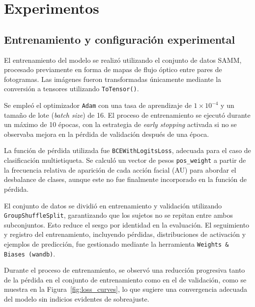 \documentclass[conference]{IEEEtran}
\begin{document}
\section{Experimentos}


\subsection{Entrenamiento y configuración experimental}

El entrenamiento del modelo se realizó utilizando el conjunto de datos SAMM, procesado previamente en forma de mapas de flujo óptico entre pares de fotogramas. Las imágenes fueron transformadas únicamente mediante la conversión a tensores utilizando \texttt{ToTensor()}.

Se empleó el optimizador \texttt{Adam} con una tasa de aprendizaje de $1 \times 10^{-4}$ y un tamaño de lote (\textit{batch size}) de 16. El proceso de entrenamiento se ejecutó durante un máximo de 10 épocas, con la estrategia de \textit{early stopping} activada si no se observaba mejora en la pérdida de validación después de una época.

La función de pérdida utilizada fue \texttt{BCEWithLogitsLoss}, adecuada para el caso de clasificación multietiqueta. Se calculó un vector de pesos \texttt{pos\_weight} a partir de la frecuencia relativa de aparición de cada acción facial (AU) para abordar el desbalance de clases, aunque este no fue finalmente incorporado en la función de pérdida.

El conjunto de datos se dividió en entrenamiento y validación utilizando \texttt{GroupShuffleSplit}, garantizando que los sujetos no se repitan entre ambos subconjuntos. Esto reduce el sesgo por identidad en la evaluación. El seguimiento y registro del entrenamiento, incluyendo pérdidas, distribuciones de activación y ejemplos de predicción, fue gestionado mediante la herramienta \texttt{Weights \& Biases (wandb)}.

Durante el proceso de entrenamiento, se observó una reducción progresiva tanto de la pérdida en el conjunto de entrenamiento como en el de validación, como se muestra en la Figura~\ref{fig:loss_curves}, lo que sugiere una convergencia adecuada del modelo sin indicios evidentes de sobreajuste.
\end{document}
